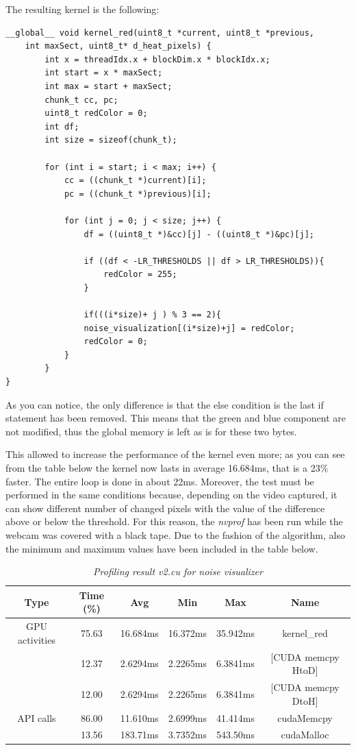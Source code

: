 \documentclass[paper=a4, fontsize=10pt]{scrartcl}	%
\begin{document}
	The resulting kernel is the following:
	
	\begin{lstlisting}[style=CStyle]
__global__ void kernel_red(uint8_t *current, uint8_t *previous,
	int maxSect, uint8_t* d_heat_pixels) {
		int x = threadIdx.x + blockDim.x * blockIdx.x;
		int start = x * maxSect;
		int max = start + maxSect;
		chunk_t cc, pc;
		uint8_t redColor = 0;
		int df;
		int size = sizeof(chunk_t);
		
		for (int i = start; i < max; i++) {
			cc = ((chunk_t *)current)[i];
			pc = ((chunk_t *)previous)[i];
			
			for (int j = 0; j < size; j++) {
				df = ((uint8_t *)&cc)[j] - ((uint8_t *)&pc)[j];
				
				if ((df < -LR_THRESHOLDS || df > LR_THRESHOLDS)){
					redColor = 255;
				}
				
				if(((i*size)+ j ) % 3 == 2){
				noise_visualization[(i*size)+j] = redColor;
				redColor = 0;
			}
		}
}	\end{lstlisting}
	As you can notice, the only difference is that the else condition is the last if statement has been removed. This means that the green and blue component are not modified, thus the global memory is left as is for these two bytes.
	
	This allowed to increase the performance of the kernel even more; as you can see from the table below the kernel now lasts in average 16.684ms, that is a 23\% faster. The entire loop is done in about 22ms. \newline\newline
	Moreover, the test must be performed in the same conditions because, depending on the video captured, it can show different number of changed pixels with the value of the difference above or below the threshold. For this reason, the \textit{nvprof} has been run while the webcam was covered with a black tape. Due to the fashion of the algorithm, also the minimum and maximum values have been included in the table below.

	\begin{table}[H]
		\centering
		\begin{center}
			\begin{tabular}{ |c|c|c|c|c|c| } 
				\hline
				\textbf{Type} & \textbf{Time} (\%) & \textbf{Avg} & \textbf{Min} & \textbf{Max} & \textbf{Name} \\ 
				\hline
				GPU activities & 75.63 & 16.684ms & 16.372ms & 35.942ms & kernel\_red \\ 
							   & 12.37 & 2.6294ms & 2.2265ms & 6.3841ms & [CUDA memcpy HtoD] \\ 
							   & 12.00 & 2.6294ms &  2.2265ms & 6.3841ms & [CUDA memcpy DtoH] \\ 
				\hline
				API calls & 86.00 &  11.610ms & 2.6999ms & 41.414ms & cudaMemcpy \\ 
						  & 13.56 & 183.71ms & 3.7352ms & 543.50ms & cudaMalloc \\ 
				\hline
			\end{tabular}
		\end{center}
		\label{fig:table_v2_red}
		\caption{\textit{Profiling result v2.cu for noise visualizer}}
	\end{table}
\end{document}
